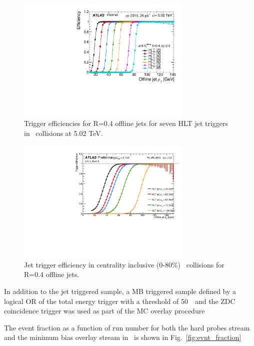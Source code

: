   \begin{figure}[h]
 \centerline{
 \includegraphics[width=0.75\textwidth]{figures/main/general/Eff_pp_5TeV_central.pdf}
}
 \caption{Trigger efficiencies for R=0.4 offline jets for seven HLT jet triggers in \pp\ collisions at 5.02 TeV.}
 \label{Fig:Trigger_pp5}
 \end{figure}


 \begin{figure}[h]
    \centerline{
       \includegraphics[width=0.75\textwidth]{figures/main/general/trigger_eff_PbPb_CentInclusive.pdf}
    }
    \caption{Jet trigger efficiency in centrality inclusive (0-80\%) \pbpb\ collisions for R=0.4 offline
    jets.}
    \label{fig:Trigger_PbPb}
 \end{figure}

In addition to the jet triggered sample, a MB triggered sample defined by a logical OR of the total energy trigger with a threshold of 50~\GeV\ and the ZDC coincidence trigger was used as part of the MC overlay procedure

The event fraction as a function of run number for both the hard probes stream and the minimum bias overlay stream in \pbpb\ is shown in Fig.~\ref{fig:evnt_fraction}


